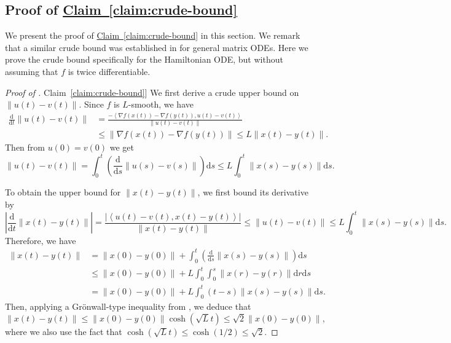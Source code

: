 \documentclass[11pt]{article}
\numberwithin{equation}{section}
\theoremstyle{definition}
\theoremstyle{plain}
\newcommand{\expref}[2]{\hyperref[#2]{#1~\ref{#2}}}
\newcommand{\dif}{\mathrm{d}}
\newcommand{\norm}[1]{\left\lVert #1 \right\rVert}
\newcommand{\ip}[2]{\left\langle #1 , #2 \right\rangle}
\newcommand{\grad}{\nabla}
\begin{document}
\subsection{Proof of \expref{Claim}{claim:crude-bound}}
\label{subsec:proof_claim}
%
We present the proof of \expref{Claim}{claim:crude-bound} in this section. We remark that a similar crude bound was established in \cite{LSV18} for general matrix ODEs. Here we prove the crude bound specifically for the Hamiltonian ODE, but without assuming that $f$ is twice differentiable.
\begin{proof}[Proof of \expref{Claim}{claim:crude-bound}]
	We first derive a crude upper bound on $\norm{u(t)-v(t)}$. Since $f$ is $L$-smooth, we have 
	\begin{align*}
		\frac{\dif}{\dif t} \norm{u(t)-v(t)} 
		&= \frac{- \ip{\grad f(x(t)) - \grad f(y(t))}{u(t)-v(t)}}{\norm{u(t)-v(t)}}\\
		&\le \norm{\grad f(x(t)) - \grad f(y(t))} 
		\le L \norm{x(t)-y(t)}.
	\end{align*}
	Then from $u(0) = v(0)$ we get
	\[
	\norm{u(t)-v(t)} = \int_{0}^t \left( \frac{\dif}{\dif s} \norm{u(s)-v(s)} \right) \dif s \le L \int_{0}^t \norm{x(s)-y(s)} \dif s.
	\]
	
	To obtain the upper bound for $\norm{x(t)-y(t)}$, we first bound its derivative by
	\begin{equation}\label{eqn:abs_deri_x-y}
	\left| \frac{\dif}{\dif t} \norm{x(t)-y(t)} \right| = \frac{\left| \ip{u(t)-v(t)}{x(t)-y(t)} \right|}{\norm{x(t)-y(t)}} \le \norm{u(t)-v(t)} \le L \int_{0}^t \norm{x(s)-y(s)} \dif s.
	\end{equation}
	Therefore, we have
	\begin{align*}
		\norm{x(t)-y(t)} &= \norm{x(0) - y(0)} + \int_{0}^t \left( \frac{\dif}{\dif s} \norm{x(s)-y(s)} \right) \dif s\\ 
		&\le \norm{x(0) - y(0)} + L \int_{0}^t \int_{0}^s \norm{x(r)-y(r)} \dif r \dif s\\
		&= \norm{x(0) - y(0)} + L \int_{0}^t (t-s) \norm{x(s)-y(s)} \dif s.
	\end{align*}
	Then, applying a Gr\"{o}nwall-type inequality from \cite[Lemma A.5]{LSV18}, we deduce that
	\begin{equation}\label{eqn:upper_norm_x-y}
	\norm{x(t)-y(t)} \le \norm{x(0) - y(0)} \cosh\left( \sqrt{L}t \right) \le \sqrt{2} \norm{x(0) - y(0)},
	\end{equation}
	where we also use the fact that $\cosh(\sqrt{L} t) \leq \cosh(1/2) \le \sqrt{2}$.
	

\end{proof}
\end{document}
